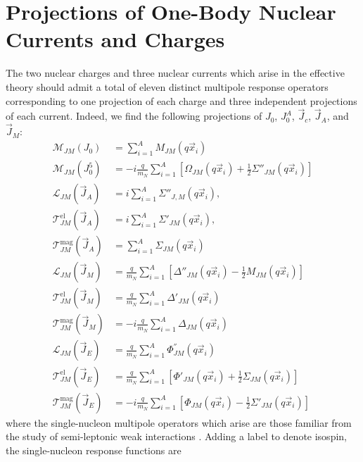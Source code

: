 \documentclass{book}[12pt]
\begin{document}
\section{Projections of One-Body Nuclear Currents and Charges}
\label{sec:single_nucleon_operators}
The two nuclear charges and three nuclear currents which arise in the effective theory should admit a total of eleven distinct multipole response operators corresponding to one projection of each charge and three independent projections of each current. Indeed, we find the following projections of $J_0$, $J_0^A$, $\vec{J}_c$, $\vec{J}_A$, and $\vec{J}_M$:
\begin{equation}
\begin{split}
\mathcal{M}_{JM}(J_0)&=\sum_{i=1}^AM_{JM}(q\vec{x}_i)\\
\mathcal{M}_{JM}(J^5_0)&=-i\frac{q}{m_N}\sum_{i=1}^A \left[\Omega_{JM}(q\vec{x}_i)+\frac{1}{2}\Sigma''_{JM}(q\vec{x}_i)\right]\\
\mathcal{L}_{JM}(\vec{J}_A)&=i\sum_{i=1}^A\Sigma''_{J,M}(q\vec{x}_i),\\
\mathcal{T}^{\mathrm{el}}_{JM}(\vec{J}_A)&=i\sum_{i=1}^A\Sigma'_{JM}(q\vec{x}_i),\\
\mathcal{T}^{\mathrm{mag}}_{JM}(\vec{J}_A)&=\sum_{i=1}^A\Sigma_{JM}(q\vec{x}_i)\\
\mathcal{L}_{JM}(\vec{J}_M)&=\frac{q}{m_N}\sum_{i=1}^A \left[\Delta''_{JM}(q\vec{x}_i)-\frac{1}{2}M_{JM}(q\vec{x}_i)\right]\\
\mathcal{T}^{\mathrm{el}}_{JM}(\vec{J}_M)&=\frac{q}{m_N}\sum_{i=1}^A\Delta'_{JM}(q\vec{x}_i)\\
\mathcal{T}^{\mathrm{mag}}_{JM}(\vec{J}_M)&=-i\frac{q}{m_N}\sum_{i=1}^A\Delta_{JM}(q\vec{x}_i)\\
\mathcal{L}_{JM}(\vec{J}_E)&=\frac{q}{m_N}\sum_{i=1}^A\Phi^{''}_{JM}(q\vec{x}_i)\\
\mathcal{T}^{\mathrm{el}}_{JM}(\vec{J}_E)&=\frac{q}{m_N}\sum_{i=1}^A\left[\Phi'_{JM}(q\vec{x}_i)+\frac{1}{2}\Sigma_{JM}(q\vec{x}_i)\right]\\
\mathcal{T}^{\mathrm{mag}}_{JM}(\vec{J}_E)&=-i\frac{q}{m_N}\sum_{i=1}^A\left[\Phi_{JM}(q\vec{x}_i)-\frac{1}{2}\Sigma'_{JM}(q\vec{x}_i)\right]
\end{split}
\end{equation}
where the single-nucleon multipole operators which arise are those familiar from the study of semi-leptonic weak interactions \cite{DONNELLY1979103,SEROT1979408}. Adding a label to denote isospin, the single-nucleon response functions are
\end{document}
